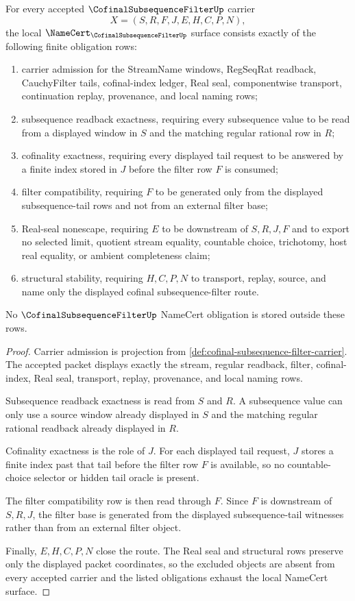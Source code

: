 \begin{theorem}
\label{thm:cofinal-subsequence-filter-namecert-obligations}
For every accepted $\CofinalSubsequenceFilterUp$ carrier
$$
X=(S,R,F,J,E,H,C,P,N),
$$
the local $\NameCert_{\CofinalSubsequenceFilterUp}$ surface consists exactly of the following finite obligation rows:
\begin{enumerate}
\item carrier admission for the StreamName windows, RegSeqRat readback, CauchyFilter tails, cofinal-index ledger, Real seal, componentwise transport, continuation replay, provenance, and local naming rows;
\item subsequence readback exactness, requiring every subsequence value to be read from a displayed window in $S$ and the matching regular rational row in $R$;
\item cofinality exactness, requiring every displayed tail request to be answered by a finite index stored in $J$ before the filter row $F$ is consumed;
\item filter compatibility, requiring $F$ to be generated only from the displayed subsequence-tail rows and not from an external filter base;
\item Real-seal nonescape, requiring $E$ to be downstream of $S,R,J,F$ and to export no selected limit, quotient stream equality, countable choice, trichotomy, host real equality, or ambient completeness claim;
\item structural stability, requiring $H,C,P,N$ to transport, replay, source, and name only the displayed cofinal subsequence-filter route.
\end{enumerate}
No $\CofinalSubsequenceFilterUp$ NameCert obligation is stored outside these rows.
\end{theorem}
\begin{proof}
Carrier admission is projection from \autoref{def:cofinal-subsequence-filter-carrier}. The accepted packet displays exactly the stream, regular readback, filter, cofinal-index, Real seal, transport, replay, provenance, and local naming rows.

Subsequence readback exactness is read from $S$ and $R$. A subsequence value can only use a source window already displayed in $S$ and the matching regular rational readback already displayed in $R$.

Cofinality exactness is the role of $J$. For each displayed tail request, $J$ stores a finite index past that tail before the filter row $F$ is available, so no countable-choice selector or hidden tail oracle is present.

The filter compatibility row is then read through $F$. Since $F$ is downstream of $S,R,J$, the filter base is generated from the displayed subsequence-tail witnesses rather than from an external filter object.

Finally, $E,H,C,P,N$ close the route. The Real seal and structural rows preserve only the displayed packet coordinates, so the excluded objects are absent from every accepted carrier and the listed obligations exhaust the local NameCert surface.
\end{proof}


